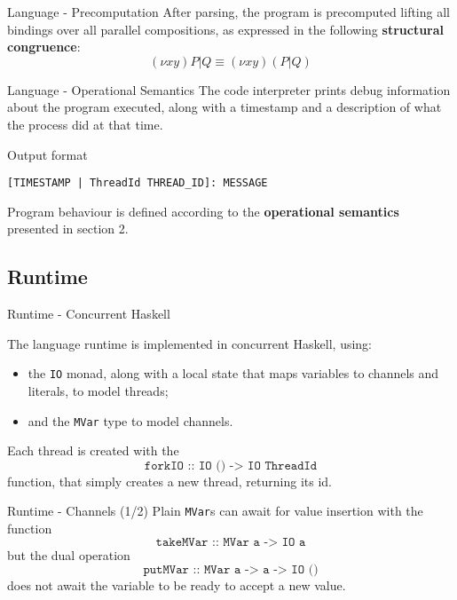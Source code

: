 \begin{frame}{Language - Precomputation}
    After parsing, the program is precomputed lifting all bindings over all parallel compositions, as expressed in the following \textbf{structural congruence}: 
    \[ (\nu x y) P | Q \equiv (\nu x y) (P | Q) \]
\end{frame}

\begin{frame}[fragile]{Language - Operational Semantics}
    The code interpreter prints debug information about the program executed, along with a timestamp and a description of what the process did at that time.

    \begin{block}{Output format}
        \begin{lstlisting}
[TIMESTAMP | ThreadId THREAD_ID]: MESSAGE
        \end{lstlisting}
    \end{block}

    Program behaviour is defined according to the \textbf{operational semantics} presented in section 2.
\end{frame}

\subsection{Runtime}

\begin{frame}{Runtime - Concurrent Haskell}

    The language runtime is implemented in concurrent Haskell, using:
    \begin{itemize}
        \item the \texttt{IO} monad, along with a local state that maps variables to channels and literals, to model threads;
        \item and the \texttt{MVar} type to model channels.
    \end{itemize}

    Each thread is created with the \[ \texttt{forkIO :: IO () -> IO ThreadId} \] function, that simply creates a new thread, returning its id. %
    
\end{frame}

\begin{frame}{Runtime - Channels (1/2)}
    Plain \texttt{MVar}s can await for value insertion with the function \[ \texttt{takeMVar :: MVar a -> IO a} \] but the dual operation \[ \texttt{putMVar :: MVar a -> a -> IO ()} \] does not await the variable to be ready to accept a new value.
\end{frame}


